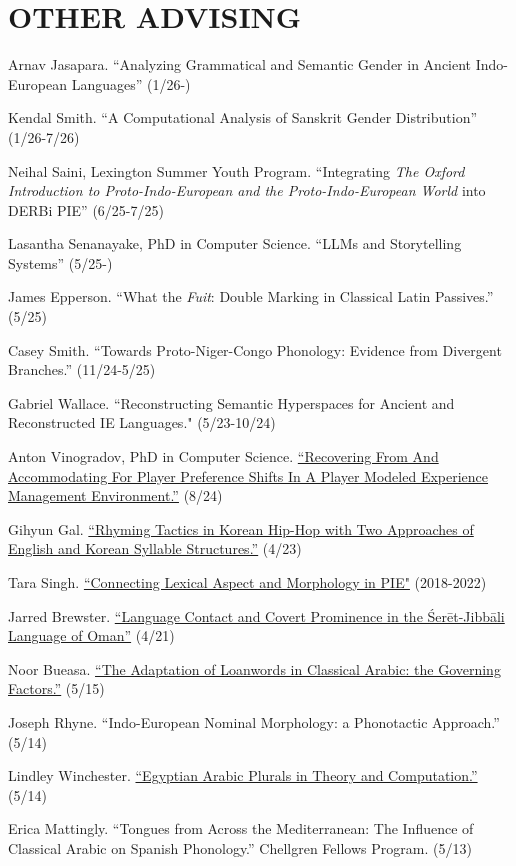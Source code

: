 \documentclass[paper=letter,fontsize=11pt,enabledeprecatedfontcommands]{scrartcl} %
\newcommand{\NewPart}[2]{\section*{\uppercase{#1} #2}}
\begin{document}
\NewPart{Other Advising}{}
\begin{etaremune}

\item Arnav Jasapara. {``Analyzing Grammatical and Semantic Gender in Ancient Indo-European Languages''} (1/26-)
\item Kendal Smith. {``A Computational Analysis of Sanskrit Gender Distribution''} (1/26-7/26)
\item Neihal Saini, Lexington Summer Youth Program. {``Integrating {\it The Oxford Introduction to Proto-Indo-European and the Proto-Indo-European World} into DERBi PIE''} (6/25-7/25)
\item Lasantha Senanayake, PhD in Computer Science. {``LLMs and Storytelling Systems''} (5/25-)
\item James Epperson. {``What the \textit{Fuit}: Double Marking in Classical 
Latin Passives.''} (5/25)
\item Casey Smith. {``Towards Proto-Niger-Congo Phonology: Evidence
from Divergent Branches.''} (11/24-5/25)
\item Gabriel Wallace. {``Reconstructing Semantic Hyperspaces for Ancient and Reconstructed IE Languages."} (5/23-10/24)
\item Anton Vinogradov, PhD in Computer Science. \href{https://uknowledge.uky.edu/cs_etds/145/}{``Recovering From And Accommodating For Player Preference Shifts In A Player Modeled Experience Management Environment.''} (8/24)
\item Gihyun Gal. \href{https://uknowledge.uky.edu/ltt_etds/54/}{``Rhyming Tactics in Korean Hip-Hop with Two Approaches of English and Korean
Syllable Structures.''} (4/23)
\item Tara Singh. {\href{https://docs.google.com/document/d/1xHEmuhhpM6MCgbzIsouXcADb8B-G9aEuPiX2yxnTHFQ/edit}{``Connecting Lexical Aspect and Morphology in PIE"}} (2018-2022)
\item Jarred Brewster. \href{https://uknowledge.uky.edu/ltt_etds/43/}{``Language Contact and Covert Prominence in the \'{S}er\={e}t-Jibb\={a}li Language of Oman''} (4/21)
\item Noor Bueasa. {\href{https://uknowledge.uky.edu/cgi/viewcontent.cgi?referer=https://www.google.com/&httpsredir=1&article=1006&context=ltt_etds}{“The Adaptation of Loanwords in Classical Arabic: the Governing Factors.”}} (5/15)
\item Joseph Rhyne.  “Indo-European Nominal Morphology: a Phonotactic Approach.” (5/14)
\item Lindley Winchester. {\href{https://uknowledge.uky.edu/ltt_etds/4/}{“Egyptian Arabic Plurals in Theory and Computation.”}} (5/14)
\item Erica Mattingly. “Tongues from Across the Mediterranean: The Influence of Classical Arabic on Spanish Phonology.” Chellgren Fellows Program. (5/13)
\end{etaremune}
\end{document}
